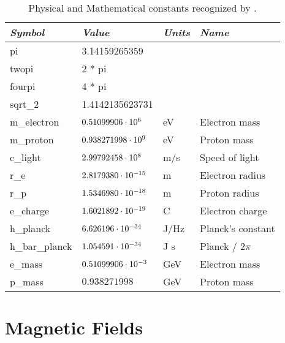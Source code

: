 \begin{table}
\centering
\begin{tabular}{|l|l|l|l|} \hline
  {\em Symbol}   & {\em Value}       & {\em Units} &  {\em Name}     \\ \hline
  pi             & 3.14159265359          &        &                   \\
  twopi          & 2 * pi                 &        &                   \\
  fourpi         & 4 * pi                 &        &                   \\
  sqrt\_2        & 1.4142135623731        &        &                   \\
  m\_electron    & $0.51099906 \cdot 10^{6}$   & eV     & Electron mass     \\
  m\_proton      & $0.938271998 \cdot 10^{9}$  & eV     & Proton mass       \\
  c\_light       & $2.99792458 \cdot 10^{8}$   & m/s    & Speed of light    \\
  r\_e           & $2.8179380 \cdot 10^{-15}$  & m      & Electron radius   \\
  r\_p           & $1.5346980 \cdot 10^{-18}$  & m      & Proton radius     \\
  e\_charge      & $1.6021892 \cdot 10^{-19}$  & C      & Electron charge   \\
  h\_planck      & $6.626196 \cdot 10^{-34}$   & J/Hz   & Planck's constant \\
  h\_bar\_planck & $1.054591 \cdot 10^{-34}$   & J s    & Planck / $2\pi$   \\
  e\_mass        & $0.51099906 \cdot 10^{-3}$  & GeV    & Electron mass     \\
  p\_mass        & $0.938271998$          & GeV    & Proton mass     \\ \hline
\end{tabular}
\caption{Physical and Mathematical constants recognized by \bmad.}
\label{t:constants}
\end{table}


\section{Magnetic Fields}

